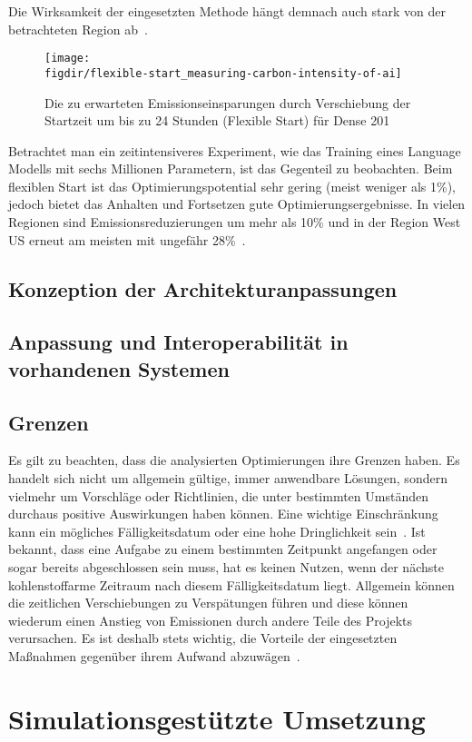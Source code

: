 Die Wirksamkeit der eingesetzten Methode hängt demnach auch stark von der betrachteten Region ab~\cite{Dodge.06212022}.
\begin{figure}
 \caption{Die zu erwarteten Emissionseinsparungen durch Verschiebung der Startzeit um bis zu 24 Stunden (Flexible Start) für Dense 201~\cite{Dodge.06212022}}
 {\texttt{[image: \\figdir/flexible-start\_measuring-carbon-intensity-of-ai]}}
 \label{FIG:flexible-start}
\end{figure}
Betrachtet man ein zeitintensiveres Experiment, wie das Training eines Language Modells mit sechs Millionen Parametern, ist das Gegenteil zu beobachten.
Beim flexiblen Start ist das Optimierungspotential sehr gering (meist weniger als 1\%), jedoch bietet das Anhalten und Fortsetzen gute Optimierungsergebnisse.
In vielen Regionen sind Emissionsreduzierungen um mehr als 10\% und in der Region West US erneut am meisten mit ungefähr 28\%~\cite{Dodge.06212022}.
\subsection{Konzeption der Architekturanpassungen}
\subsection{Anpassung und Interoperabilität in vorhandenen Systemen}
\subsection{Grenzen}
Es gilt zu beachten, dass die analysierten Optimierungen ihre Grenzen haben.
Es handelt sich nicht um allgemein gültige, immer anwendbare Lösungen, sondern vielmehr um Vorschläge oder Richtlinien, die unter bestimmten Umständen durchaus positive Auswirkungen haben können.
Eine wichtige Einschränkung kann ein mögliches Fälligkeitsdatum oder eine hohe Dringlichkeit sein~\cite{Dodge.06212022}.
Ist bekannt, dass eine Aufgabe zu einem bestimmten Zeitpunkt angefangen oder sogar bereits abgeschlossen sein muss, hat es keinen Nutzen, wenn der nächste kohlenstoffarme Zeitraum nach diesem Fälligkeitsdatum liegt.
Allgemein können die zeitlichen Verschiebungen zu Verspätungen führen und diese können wiederum einen Anstieg von Emissionen durch andere Teile des Projekts verursachen.
Es ist deshalb stets wichtig, die Vorteile der eingesetzten Maßnahmen gegenüber ihrem Aufwand abzuwägen~\cite{Dodge.06212022}.
\section{Simulationsgestützte Umsetzung}

